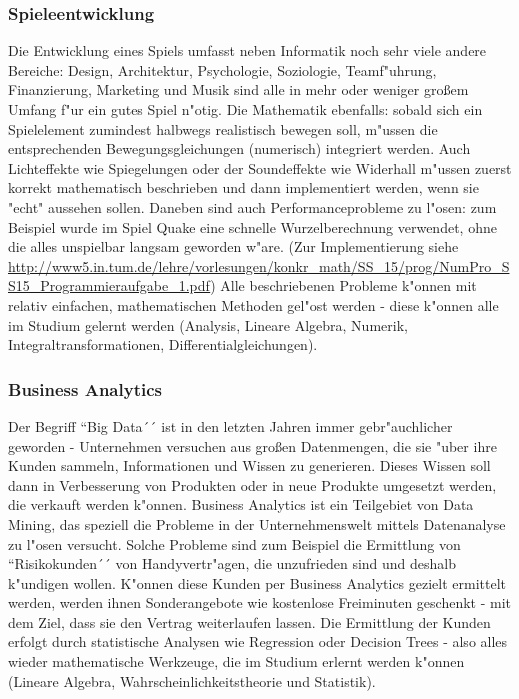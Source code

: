 \subsubsection{Spieleentwicklung}
Die Entwicklung eines Spiels umfasst neben Informatik noch sehr viele andere Bereiche: Design, Architektur, Psychologie, Soziologie, Teamf"uhrung, Finanzierung, Marketing und Musik sind alle in mehr oder weniger gro\ss em Umfang f"ur ein gutes Spiel n"otig. Die Mathematik ebenfalls: sobald sich ein Spielelement zumindest halbwegs realistisch bewegen soll, m"ussen die entsprechenden Bewegungsgleichungen (numerisch) integriert werden. Auch Lichteffekte wie Spiegelungen oder der Soundeffekte wie Widerhall m"ussen zuerst korrekt mathematisch beschrieben und dann implementiert werden, wenn sie "echt" aussehen sollen. Daneben sind auch Performanceprobleme zu l"osen: zum Beispiel wurde im Spiel Quake eine schnelle Wurzelberechnung verwendet, ohne die alles unspielbar langsam geworden w"are. (Zur Implementierung siehe \url{http://www5.in.tum.de/lehre/vorlesungen/konkr_math/SS_15/prog/NumPro_SS15_Programmieraufgabe_1.pdf})
Alle beschriebenen Probleme k"on\-nen mit relativ einfachen, mathematischen Methoden gel"ost werden - diese k"onnen alle im Studium gelernt werden (Analysis, Lineare Algebra, Numerik, Integraltransformationen, Differentialgleichungen).

\subsubsection{Business Analytics}
Der Begriff ``Big Data´´ ist in den letzten Jahren immer gebr"auchlicher geworden - Unternehmen versuchen aus gro\ss en Datenmengen, die sie "uber ihre Kunden sammeln, Informationen und Wissen zu generieren. Dieses Wissen soll dann in Verbesserung von Produkten oder in neue Produkte umgesetzt werden, die verkauft werden k"onnen. Business Analytics ist ein Teilgebiet von Data Mining, das speziell die Probleme in der Unternehmenswelt mittels Datenanalyse zu l"osen versucht. Solche Probleme sind zum Beispiel die Ermittlung von ``Risikokunden´´ von Handyvertr"agen, die unzufrieden sind und deshalb k"undigen wollen. K"onnen diese Kunden per Business Analytics gezielt ermittelt werden, werden ihnen Sonderangebote wie kostenlose Freiminuten geschenkt - mit dem Ziel, dass sie den Vertrag weiterlaufen lassen. Die Ermittlung der Kunden erfolgt durch statistische Analysen wie Regression oder Decision Trees - also alles wieder mathematische Werkzeuge, die im Studium erlernt werden k"onnen (Lineare Algebra, Wahrscheinlichkeitstheorie und Statistik).


